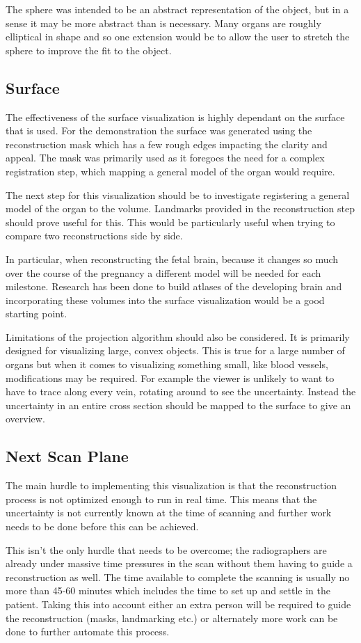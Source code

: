 The sphere was intended to be an abstract representation of the object, but in a sense it may be more abstract than is necessary. Many organs are roughly elliptical in shape and so one extension would be to allow the user to stretch the sphere to improve the fit to the object.

\subsection*{Surface}
The effectiveness of the surface visualization is highly dependant on the surface that is used. For the demonstration the surface was generated using the reconstruction mask which has a few rough edges impacting the clarity and appeal. The mask was primarily used as it foregoes the need for a complex registration step, which mapping a general model of the organ would require.

The next step for this visualization should be to investigate registering a general model of the organ to the volume. Landmarks provided in the reconstruction step should prove useful for this. This would be particularly useful when trying to compare two reconstructions side by side.

In particular, when reconstructing the fetal brain, because it changes so much over the course of the pregnancy a different model will be needed for each milestone. Research has been done to build atlases of the developing brain\cite{fetalatlas} and incorporating these volumes into the surface visualization would be a good starting point.

Limitations of the projection algorithm should also be considered. It is primarily designed for visualizing large, convex objects. This is true for a large number of organs but when it comes to visualizing something small, like blood vessels, modifications may be required. For example the viewer is unlikely to want to have to trace along every vein, rotating around to see the uncertainty. Instead the uncertainty in an entire cross section should be mapped to the surface to give an overview.

\subsection*{Next Scan Plane}
The main hurdle to implementing this visualization is that the reconstruction process is not optimized enough to run in real time. This means that the uncertainty is not currently known at the time of scanning and further work needs to be done before this can be achieved.

This isn't the only hurdle that needs to be overcome; the radiographers are already under massive time pressures in the scan without them having to guide a reconstruction as well. The time available to complete the scanning is usually no more than 45-60 minutes which includes the time to set up and settle in the patient. Taking this into account either an extra person will be required to guide the reconstruction (masks, landmarking etc.) or alternately more work can be done to further automate this process.